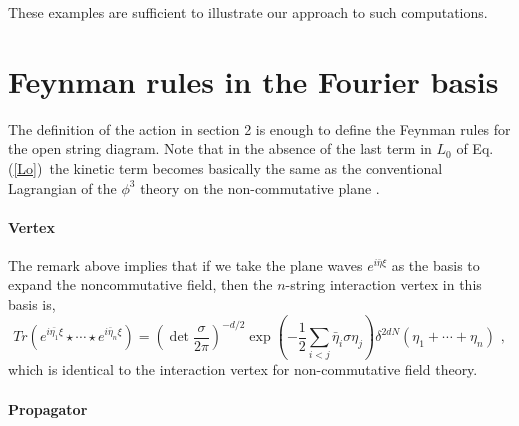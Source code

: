 \documentclass[a4paper,11pt]{article}
\begin{document}
These examples are sufficient to illustrate our approach to such
computations.

\section{Feynman rules in the Fourier basis}

The definition of the action in section 2 is enough to define the Feynman
rules for the open string diagram. Note that in the absence of the last term
in $L_{0}$ of Eq.(\ref{Lo})\ the kinetic term becomes basically the same as
the conventional Lagrangian of the $\phi ^{3}$ theory on the non-commutative
plane \cite{Noncomm}.

\paragraph{Vertex}

The remark above implies that if we take the plane waves $e^{i\bar{\eta} \xi }$ as
the basis to expand the noncommutative field, then the $n$-string
interaction vertex in this basis is,
\begin{equation}
Tr\left( e^{i\bar{\eta _{1}}\xi }\star \cdots \star
e^{i\bar{\eta}_{n}\xi }\right)
=\left(\det{\frac{\sigma}{2\pi}}\right)^{-d/2}\exp \left(
-\frac{1}{2}\sum_{i<j}\bar{\eta}_{i}\sigma \eta
_{j}\right)\delta^{2dN} (\eta _{1}+\cdots +\eta _{n})\,\,,
\label{n-vertex}
\end{equation}%
which is identical to the interaction vertex for non-commutative field
theory.

\paragraph{Propagator}
\end{document}
